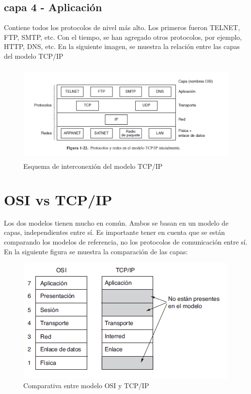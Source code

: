\subsection{capa 4 - Aplicación}
Contiene todos los protocolos de nivel más alto. Los primeros fueron TELNET, FTP, SMTP, etc. Con el tiempo, se han agregado otros protocolos, por ejemplo, HTTP, DNS, etc. 
En la siguiente imagen, se muestra la relación entre las capas del modelo TCP/IP
\begin{figure}[ht]
	\centering
	\includegraphics[height=5.0cm]{cap_ap_tcpip}
	\caption{Esquema de interconexión del modelo TCP/IP}
\end{figure}


\section{OSI vs TCP/IP }

Los dos modelos tienen mucho en común. Ambos se basan en un modelo de capas, independientes entre sí. Es importante tener en cuenta que se están comparando los modelos de referencia, no los protocolos de comunicación entre sí. En la siguiente figura se muestra la comparación de las capas:  

\begin{figure}[ht]
	\centering 
	\includegraphics{comptcposi}
	\caption{Comparativa entre modelo OSI y TCP/IP}
	\label{fig:comp_tcposi}
\end{figure}

